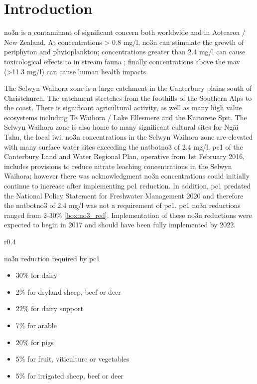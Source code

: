 
\section[Introduction]{Introduction} \label{sec:intro}

\gls{no3n} is a contaminant of significant concern both worldwide and in Aotearoa / New Zealand.
At concentrations > 0.8 mg/l, \gls{no3n} can stimulate the growth of periphyton and phytoplankton\citep{mcdowell_global_2020}; concentrations greater than 2.4 mg/l can cause toxicological effects to in stream fauna
\citep{camargo_nitrate_2005, horak_assessing_2019,wagenhoff_identifying_2017};
finally concentrations above the \gls{mav} (>11.3 mg/l) can cause human health impacts\citep{rahman_anthropogenic_2021}.

The Selwyn Waihora zone is a large catchment in the Canterbury plains south of Christchurch.
The catchment stretches from the foothills of the Southern Alps to the coast.
There is significant agricultural activity, as well as many high value ecosystems including Te Waihora / Lake Ellesmere and the Kaitorete Spit.
The Selwyn Waihora zone is also home to many significant cultural sites for Ngāi Tahu, the local iwi.
\gls{no3n} concentrations in the Selwyn Waihora zone are elevated with many surface water sites exceeding the \gls{natbotno3} of 2.4 mg/l\citep{noauthor_national_2020}.
\gls{pc1} of the Canterbury Land and Water Regional Plan, operative from 1st February 2016, includes provisions to reduce nitrate leaching concentrations in the Selwyn Waihora; however there was acknowledgment \gls{no3n} concentrations could initially continue to increase after implementing \gls{pc1} reduction.
In addition, \gls{pc1} predated the National Policy Statement for Freshwater Management 2020 and therefore the \gls{natbotno3} of 2.4 mg/l was not a requirement of \gls{pc1}.
\gls{pc1} \gls{no3n} reductions ranged from 2-30\% \autoref{box:no3_red}.
Implementation of these \gls{no3n} reductions were expected to begin in 2017 and should have been fully implemented by 2022.

\begin{\wrapfigure}{r}{0.4\textwidth}
    \begin{\breakawaybox}[label={box:no3_red}]{\gls{no3n} reduction required by \gls{pc1}}
        \begin{itemize}
            \item 30\% for dairy
            \item 2\% for dryland sheep, beef or deer
            \item 22\% for dairy support
            \item 7\% for arable
            \item 20\% for pigs
            \item 5\% for fruit, viticulture or vegetables
            \item 5\% for irrigated sheep, beef or deer
        \end{itemize}
    \end{\breakawaybox}
\end{\wrapfigure}

